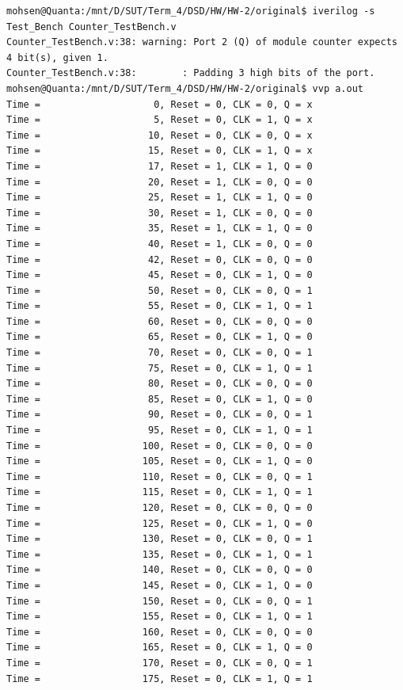 \begin{latin}
    \begin{lstlisting}[basicstyle=\ttfamily\small, breaklines=true, postbreak=\mbox{\textcolor{red}{$\hookrightarrow$}\space}]
mohsen@Quanta:/mnt/D/SUT/Term_4/DSD/HW/HW-2/original$ iverilog -s Test_Bench Counter_TestBench.v
Counter_TestBench.v:38: warning: Port 2 (Q) of module counter expects 4 bit(s), given 1.
Counter_TestBench.v:38:        : Padding 3 high bits of the port.
mohsen@Quanta:/mnt/D/SUT/Term_4/DSD/HW/HW-2/original$ vvp a.out 
Time =                    0, Reset = 0, CLK = 0, Q = x
Time =                    5, Reset = 0, CLK = 1, Q = x
Time =                   10, Reset = 0, CLK = 0, Q = x
Time =                   15, Reset = 0, CLK = 1, Q = x
Time =                   17, Reset = 1, CLK = 1, Q = 0
Time =                   20, Reset = 1, CLK = 0, Q = 0
Time =                   25, Reset = 1, CLK = 1, Q = 0
Time =                   30, Reset = 1, CLK = 0, Q = 0
Time =                   35, Reset = 1, CLK = 1, Q = 0
Time =                   40, Reset = 1, CLK = 0, Q = 0
Time =                   42, Reset = 0, CLK = 0, Q = 0
Time =                   45, Reset = 0, CLK = 1, Q = 0
Time =                   50, Reset = 0, CLK = 0, Q = 1
Time =                   55, Reset = 0, CLK = 1, Q = 1
Time =                   60, Reset = 0, CLK = 0, Q = 0
Time =                   65, Reset = 0, CLK = 1, Q = 0
Time =                   70, Reset = 0, CLK = 0, Q = 1
Time =                   75, Reset = 0, CLK = 1, Q = 1
Time =                   80, Reset = 0, CLK = 0, Q = 0
Time =                   85, Reset = 0, CLK = 1, Q = 0
Time =                   90, Reset = 0, CLK = 0, Q = 1
Time =                   95, Reset = 0, CLK = 1, Q = 1
Time =                  100, Reset = 0, CLK = 0, Q = 0
Time =                  105, Reset = 0, CLK = 1, Q = 0
Time =                  110, Reset = 0, CLK = 0, Q = 1
Time =                  115, Reset = 0, CLK = 1, Q = 1
Time =                  120, Reset = 0, CLK = 0, Q = 0
Time =                  125, Reset = 0, CLK = 1, Q = 0
Time =                  130, Reset = 0, CLK = 0, Q = 1
Time =                  135, Reset = 0, CLK = 1, Q = 1
Time =                  140, Reset = 0, CLK = 0, Q = 0
Time =                  145, Reset = 0, CLK = 1, Q = 0
Time =                  150, Reset = 0, CLK = 0, Q = 1
Time =                  155, Reset = 0, CLK = 1, Q = 1
Time =                  160, Reset = 0, CLK = 0, Q = 0
Time =                  165, Reset = 0, CLK = 1, Q = 0
Time =                  170, Reset = 0, CLK = 0, Q = 1
Time =                  175, Reset = 0, CLK = 1, Q = 1

\end{lstlisting}
\end{latin}
